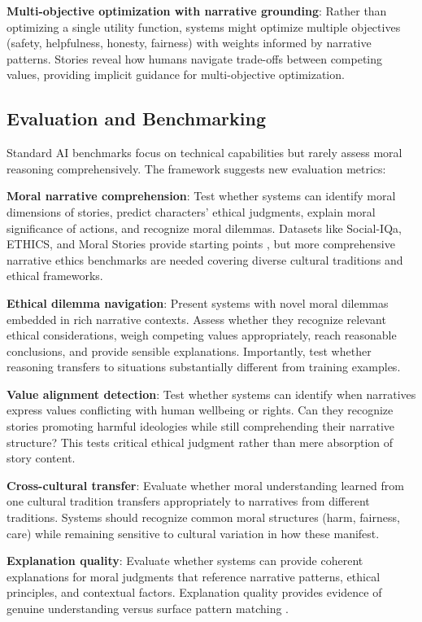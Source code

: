 \documentclass[12pt]{article}
\begin{document}
\textbf{Multi-objective optimization with narrative grounding}: Rather than optimizing a single utility function, systems might optimize multiple objectives (safety, helpfulness, honesty, fairness) with weights informed by narrative patterns. Stories reveal how humans navigate trade-offs between competing values, providing implicit guidance for multi-objective optimization.

\subsection{Evaluation and Benchmarking}

Standard AI benchmarks focus on technical capabilities but rarely assess moral reasoning comprehensively. The framework suggests new evaluation metrics:

\textbf{Moral narrative comprehension}: Test whether systems can identify moral dimensions of stories, predict characters' ethical judgments, explain moral significance of actions, and recognize moral dilemmas. Datasets like Social-IQa, ETHICS, and Moral Stories provide starting points \citep{sap2019socialiqa, hendrycks2021aligning, emelin2021moral}, but more comprehensive narrative ethics benchmarks are needed covering diverse cultural traditions and ethical frameworks.

\textbf{Ethical dilemma navigation}: Present systems with novel moral dilemmas embedded in rich narrative contexts. Assess whether they recognize relevant ethical considerations, weigh competing values appropriately, reach reasonable conclusions, and provide sensible explanations. Importantly, test whether reasoning transfers to situations substantially different from training examples.

\textbf{Value alignment detection}: Test whether systems can identify when narratives express values conflicting with human wellbeing or rights. Can they recognize stories promoting harmful ideologies while still comprehending their narrative structure? This tests critical ethical judgment rather than mere absorption of story content.

\textbf{Cross-cultural transfer}: Evaluate whether moral understanding learned from one cultural tradition transfers appropriately to narratives from different traditions. Systems should recognize common moral structures (harm, fairness, care) while remaining sensitive to cultural variation in how these manifest.

\textbf{Explanation quality}: Evaluate whether systems can provide coherent explanations for moral judgments that reference narrative patterns, ethical principles, and contextual factors. Explanation quality provides evidence of genuine understanding versus surface pattern matching \citep{mittelstadt2019explaining}.
\end{document}
